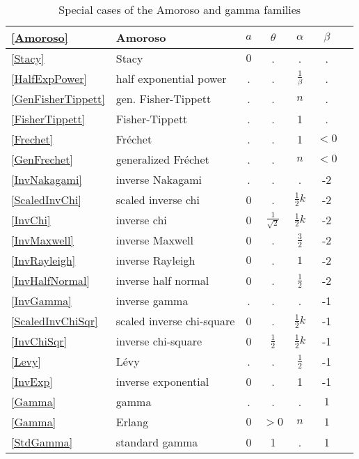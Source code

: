 \begin{table*}[p]
\begin{center}
\label{AmorosoTable}
\caption[Amoroso and gamma distributions -- Special cases]{Special cases of the Amoroso and gamma families}
~\\
{\renewcommand{\arraystretch}{1.1} 
\begin{tabular}{llccccl}
\eqref{Amoroso} &Amoroso & $a$ & $\theta$ & $\alpha$ & $\beta$
\\ \hline
\eqref{Stacy} & Stacy & $0$ & . & . & . \\
\eqref{HalfExpPower} & half exponential power & . & . & $\tfrac{1}{\beta}$ & . \\
\eqref{GenFisherTippett} & gen. Fisher-Tippett  & . & . & $n$ & .  \\
\eqref{FisherTippett} &  Fisher-Tippett & . & . & 1 & .  \\
\eqref{Frechet} &Fr\'{e}chet  & . & . & 1 &  $<\!\!0$  \\
\eqref{GenFrechet} &  generalized Fr\'{e}chet & . & . & $n$ & $<\!\!0$ \\
\eqref{InvNakagami} & inverse Nakagami & . & . & . & -2 \\
\eqref{ScaledInvChi} &scaled inverse chi& 0 & . & $\tfrac{1}{2}k$  & -2  \\
\eqref{InvChi} & inverse chi  & 0 & $\frac{1}{\sqrt{2}}$ & $\tfrac{1}{2}k$ & -2 \\
\eqref{InvMaxwell} & inverse Maxwell& 0 & . & $\frac{3}{2}$  & -2  \\
\eqref{InvRayleigh} &  inverse Rayleigh  & $0$ & . & $1$ & -2 \\
\eqref{InvHalfNormal} & inverse half normal & 0 & . & $\tfrac{1}{2}$ & -2 & \\  
\eqref{InvGamma} & inverse gamma & . & . & . & -1 \\
\eqref{ScaledInvChiSqr} & scaled inverse chi-square & 0 & . & $\tfrac{1}{2}k$ & -1 \\
\eqref{InvChiSqr} & inverse chi-square & 0 & $\frac{1}{2}$ & $\tfrac{1}{2}k$ & -1 \\
\eqref{Levy} & L\'{e}vy &  . & . & $\frac{1}{2}$ & -1 \\
\eqref{InvExp} &  inverse exponential & 0  & . & 1 & -1 \\
\eqref{Gamma} &gamma & . & . & . & $1$ \\
\eqref{Gamma} & Erlang & $0$ & $>\!\!0$ & $n$ & $1$ \\
\eqref{StdGamma} &standard gamma & 0 & 1 & . & 1  \\ 

\end{tabular}}
\end{center}
\end{table*}
